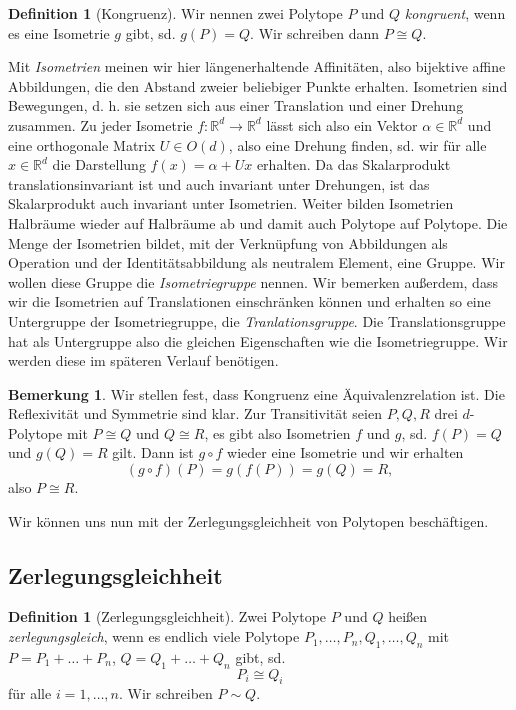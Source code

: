 \documentclass[11pt,titlepage]{article}
\newcommand{\setR}{\mathbb{R}}
\theoremstyle{definition}
\newtheorem{definition}[theorem]{Definition}
\newtheorem{remark}[theorem]{Bemerkung}
\theoremstyle{remark}
\begin{document}
	\begin{definition}[Kongruenz] \label{def:kong}
		Wir nennen zwei Polytope $P$ und $Q$ \textsl{kongruent}, wenn es eine Isometrie $g$ gibt, sd. 
		$g(P)=Q$. Wir schreiben dann $P\cong Q$.
	\end{definition}

	 Mit \textsl{Isometrien} meinen wir hier längenerhaltende Affinitäten, 
	 also bijektive affine Abbildungen, die den Abstand zweier beliebiger Punkte erhalten. 
	 Isometrien sind Bewegungen, d. h. sie setzen sich 
	 aus einer Translation und einer Drehung zusammen. Zu jeder 
	 Isometrie $f:\setR^d\to\setR^d$ lässt sich also ein Vektor 
	 $\alpha\in\setR^d$ und eine orthogonale Matrix $U\in O(d)$, also 
	 eine Drehung finden, sd. wir für alle $x\in \setR^d$ 
	 die Darstellung $f(x)=\alpha + Ux$ erhalten. 
	 Da das Skalarprodukt translationsinvariant ist und 
	 auch invariant unter Drehungen, ist das Skalarprodukt auch invariant 
	 unter Isometrien. Weiter bilden Isometrien Halbräume wieder auf 
	 Halbräume ab und damit auch Polytope auf Polytope. Die Menge 
	 der Isometrien bildet, mit der Verknüpfung von Abbildungen als 
	 Operation und der Identitätsabbildung als neutralem Element, eine Gruppe. 
	 Wir wollen 
	 diese Gruppe die \textsl{Isometriegruppe} nennen. Wir bemerken außerdem, dass 
	 wir die Isometrien auf Translationen einschränken können und erhalten 
	 so eine Untergruppe der Isometriegruppe, die \textsl{Tranlationsgruppe}. Die 
	 Translationsgruppe hat als Untergruppe also die gleichen Eigenschaften wie die 
	 Isometriegruppe. Wir werden diese im späteren Verlauf benötigen.

	\begin{remark}
		Wir stellen fest, dass Kongruenz eine Äquivalenzrelation ist. 
		Die Reflexivität und Symmetrie sind klar. Zur Transitivität seien 
		$P,Q,R$ drei $d$-Polytope mit $P\cong Q$ und $Q\cong R$, es gibt also 
		Isometrien $f$ und $g$, sd. $f(P)=Q$ und $g(Q)=R$ gilt. Dann ist $g\circ f$ 
		wieder eine Isometrie und wir erhalten 
		\[(g\circ f)(P)=g(f(P))=g(Q)=R,\]
		also $P\cong R$. 
	\end{remark}
	
	Wir können uns nun mit der Zerlegungsgleichheit von Polytopen beschäftigen.
	
	\subsection{Zerlegungsgleichheit}
	
	\begin{definition}[Zerlegungsgleichheit]
		Zwei Polytope $P$ und $Q$ heißen \textsl{zerlegungsgleich}, wenn es endlich viele Polytope 
		$P_1,\ldots,P_n,Q_1,\ldots,Q_n$ mit $P=P_1 +\ldots +P_n$,  $Q=Q_1 +\ldots+Q_n$ 
		gibt, sd. 
		\[P_i\cong Q_i\]
		für alle $i=1,\ldots,n$. Wir schreiben $P\sim Q$.
	\end{definition}
	
\end{document}
